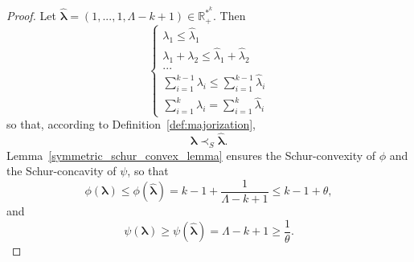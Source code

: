 \documentclass[twoside,11pt]{book}
\numberwithin{theorem}{chapter}
\numberwithin{definition}{chapter}
\numberwithin{proposition}{chapter}
\numberwithin{corollary}{chapter}
\numberwithin{example}{chapter}
\numberwithin{lemma}{chapter}
\numberwithin{assumption}{chapter}
\numberwithin{equation}{chapter}
\numberwithin{figure}{chapter}
\begin{document}
\begin{proof}
Let $\hat{\bm{\lambda}} = (1,...,1,\Lambda -k +1) \in \mathbb{R}_{+}^{*^{k}}$. Then
\begin{equation}
\left\{
    \begin{array}{ll}
        \lambda_{1} \leq \hat{\lambda}_{1} \\
        \lambda_{1} + \lambda_{2} \leq \hat{\lambda}_{1} + \hat{\lambda}_{2} \\
        ... \\
        \sum\limits_{i=1}^{k-1} \lambda_{i} \leq \sum\limits_{i=1}^{k-1} \hat{\lambda}_{i}\\
        \sum\limits_{i=1}^{k} \lambda_{i} = \sum\limits_{i=1}^{k} \hat{\lambda}_{i}
    \end{array}
\right.
\end{equation}
so that, according to Definition~\ref{def:majorization},
\begin{equation}
    \bm{\lambda} \prec_{S} \hat{\bm{\lambda}}.
\end{equation}
Lemma~\ref{symmetric_schur_convex_lemma} ensures the Schur-convexity of $\phi$ and the Schur-concavity of $\psi$, so that
$$\phi(\bm{\lambda})  \leq \phi(\hat{\bm{\lambda}}) = k-1 + \frac{1}{\Lambda - k +1} \leq k-1+\theta,$$
and
$$\psi(\bm{\lambda}) \geq \psi(\hat{\bm{\lambda}}) = \Lambda - k +1\geq \frac{1}{\theta}.$$
\end{proof}



\end{document}
